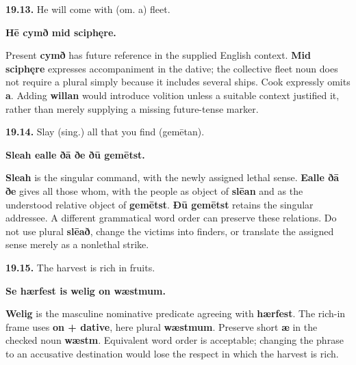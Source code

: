 \par\begin{minipage}{\linewidth}\raggedright
\textbf{19.13.} He will come with (om. a) fleet.

\textbf{Hē cymð mid sciphęre.}

Present \textbf{cymð} has future reference in the supplied English context. \textbf{Mid sciphęre} expresses accompaniment in the dative; the collective fleet noun does not require a plural simply because it includes several ships. Cook expressly omits \textbf{a}. Adding \textbf{willan} would introduce volition unless a suitable context justified it, rather than merely supplying a missing future-tense marker.

\end{minipage}\par\addvspace{4pt}

\par\begin{minipage}{\linewidth}\raggedright
\textbf{19.14.} Slay (sing.) all that you find (gemētan).

\textbf{Sleah ealle ðā ðe ðū gemētst.}

\textbf{Sleah} is the singular command, with the newly assigned lethal sense. \textbf{Ealle ðā ðe} gives all those whom, with the people as object of \textbf{slēan} and as the understood relative object of \textbf{gemētst}. \textbf{Ðū gemētst} retains the singular addressee. A different grammatical word order can preserve these relations. Do not use plural \textbf{slēað}, change the victims into finders, or translate the assigned sense merely as a nonlethal strike.

\end{minipage}\par\addvspace{4pt}

\par\begin{minipage}{\linewidth}\raggedright
\textbf{19.15.} The harvest is rich in fruits.

\textbf{Se hærfest is welig on wæstmum.}

\textbf{Welig} is the masculine nominative predicate agreeing with \textbf{hærfest}. The rich-in frame uses \textbf{on + dative}, here plural \textbf{wæstmum}. Preserve short \textbf{æ} in the checked noun \textbf{wæstm}. Equivalent word order is acceptable; changing the phrase to an accusative destination would lose the respect in which the harvest is rich.

\end{minipage}\par\addvspace{4pt}

